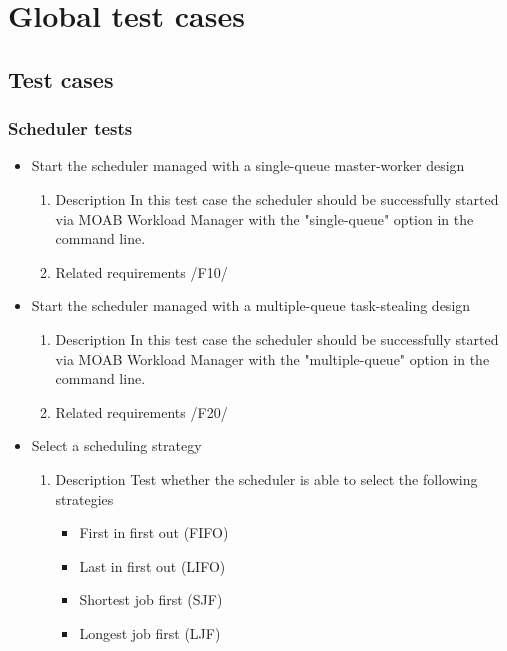 {
\setcounter{test}{10}
\renewcommand{\labelitemi}{
	\ifnum \value{test}<10$/T 0\arabic{test} /$\addtocounter{test}{10}
	\else $/T \arabic{test} /$\addtocounter{test}{10}\fi
}

\section{Global test cases}
	\subsection{Test cases}
		\subsubsection{Scheduler tests}
			\begin{itemize}
				
				\item Start the scheduler managed with a single-queue master-worker design 				
				
					\begin{enumerate}
						\item Description\newline
In this test case the scheduler should be successfully started via MOAB Workload Manager with the "single-queue" option in the command line.
						\item Related requirements\newline
 							  /F10/		
					\end{enumerate}					  
											
				
				
				\item Start the scheduler managed with a multiple-queue task-stealing design
				\begin{enumerate}
						\item Description\newline
In this test case the scheduler should be successfully started via MOAB Workload Manager with the "multiple-queue" option in the command line.
						\item Related requirements\newline
 							  /F20/		
				\end{enumerate}	
				
				
				\item Select a scheduling strategy 
			    \begin{enumerate}
						\item Description\newline
							Test whether the scheduler is able to select the following strategies
							\begin{itemize}
							 	\item First in first out (FIFO)
							 	\item Last in first out (LIFO)
							 	\item Shortest job first (SJF)
							 	\item Longest job first
(LJF)
								

\end{itemize}
\end{enumerate}
\end{itemize}}
